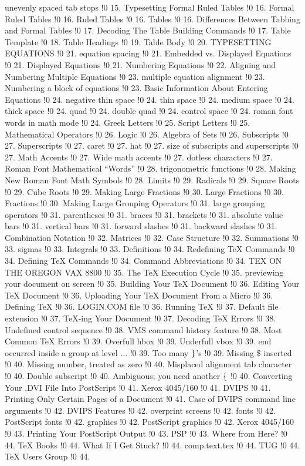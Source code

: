 unevenly spaced tab stops !0 15.
Typesetting Formal Ruled Tables !0 16.
Formal Ruled Tables !0 16.
Ruled Tables !0 16.
Tables !0 16.
Differences Between Tabbing and Formal Tables !0 17.
Decoding The Table Building Commands !0 17.
Table Template !0 18.
Table Headings !0 19.
Table Body !0 20.
TYPESETTING EQUATIONS !0 21.
equation spacing !0 21.
Embedded vs. Displayed Equations !0 21.
Displayed Equations !0 21.
Numbering Equations !0 22.
Aligning and Numbering Multiple Equations !0 23.
multiple equation alignment !0 23.
Numbering a block of equations !0 23.
Basic Information About Entering Equations !0 24.
negative thin space !0 24.
thin space !0 24.
medium space !0 24.
thick space !0 24.
quad !0 24.
double quad !0 24.
control space !0 24.
roman font words in math mode !0 24.
Greek Letters !0 25.
Script Letters !0 25.
Mathematical Operators !0 26.
Logic !0 26.
Algebra of Sets !0 26.
Subscripts !0 27.
Superscripts !0 27.
caret !0 27.
hat !0 27.
size of subscripts and superscripts !0 27.
Math Accents !0 27.
Wide math accents !0 27.
dotless characters !0 27.
Roman Font Mathematical ``Words'' !0 28.
trigonometric functions !0 28.
Making New Roman Font Math Symbols !0 28.
Limits !0 29.
Radicals !0 29.
Square Roots !0 29.
Cube Roots !0 29.
Making Large Fractions !0 30.
Large Fractions !0 30.
Fractions !0 30.
Making Large Grouping Operators !0 31.
large grouping operators !0 31.
parentheses !0 31.
braces !0 31.
brackets !0 31.
absolute value bars !0 31.
vertical bars !0 31.
forward slashes !0 31.
backward slashes !0 31.
Combination Notation !0 32.
Matrices !0 32.
Case Structure !0 32.
Summations !0 33.
sigmas !0 33.
Integrals !0 33.
Definitions !0 34.
Redefining TeX Commands !0 34.
Defining TeX Commands !0 34.
Command Abbreviations !0 34.
TEX ON THE OREGON VAX 8800 !0 35.
The TeX Execution Cycle !0 35.
previewing your document on screen !0 35.
Building Your TeX Document !0 36.
Editing Your TeX Document !0 36.
Uploading Your TeX Document From a Micro !0 36.
Defining TeX !0 36.
LOGIN.COM file !0 36.
Running TeX !0 37.
Default file extension !0 37.
TeX-ing Your Document !0 37.
Decoding TeX Errors !0 38.
Undefined control sequence !0 38.
VMS command history feature !0 38.
Most Common TeX Errors !0 39.
Overfull hbox !0 39.
Underfull vbox !0 39.
end occurred inside a group at level ... !0 39.
Too many $\delimiter "5267309 $'s !0 39.
Missing \$ inserted !0 40.
Missing number, treated as zero !0 40.
Misplaced alignment tab character !0 40.
Double subscript !0 40.
Ambiguous; you need another $\delimiter "4266308 $ !0 40.
Converting Your .DVI File Into PostScript !0 41.
Xerox 4045/160 !0 41.
DVIPS !0 41.
Printing Only Certain Pages of a Document !0 41.
Case of DVIPS command line arguments !0 42.
DVIPS Features !0 42.
overprint screens !0 42.
fonts !0 42.
PostScript fonts !0 42.
graphics !0 42.
PostScript graphics !0 42.
Xerox 4045/160 !0 43.
Printing Your PostScript Output !0 43.
PSP !0 43.
Where from Here? !0 44.
TeX Books !0 44.
What If I Get Stuck? !0 44.
comp.text.tex !0 44.
TUG !0 44.
TeX Users Group !0 44.
